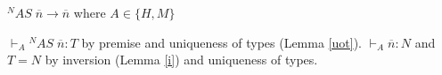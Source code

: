 \begin{case}
$^{N}AS\;\overline{n}\rightarrow\overline{n}$ where $A\in\lbrace H,M\rbrace$

$\vdash_{A}{^{N}A}S\;\overline{n}:T$ by premise and uniqueness of types (Lemma \ref{uot}).  $\vdash_{A}\overline{n}:N$ and $T=N$ by inversion (Lemma \ref{i}) and uniqueness of types.
\end{case}